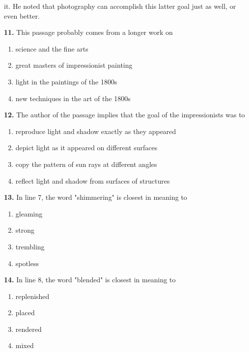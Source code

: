 \documentclass[12pt]{article}
\begin{document}
it. He noted that photography can accomplish this latter goal just as well, or even better.\par
\endgroup
\medskip
\noindent\textbf{11.} This passage probably comes from a longer work on
\begin{enumerate}[label=(\Alph*),leftmargin=*,itemsep=0.2em]
\item science and the fine arts
\item great masters of impressionist painting
\item light in the paintings of the 1800s
\item new techniques in the art of the 1800s
\end{enumerate}
\par
\vspace{0.25\baselineskip}
\noindent\textbf{12.} The author of the passage implies that the goal of the impressionists was to
\begin{enumerate}[label=(\Alph*),leftmargin=*,itemsep=0.2em]
\item reproduce light and shadow exactly as they appeared
\item depict light as it appeared on different surfaces
\item copy the pattern of sun rays at different angles
\item reflect light and shadow from surfaces of structures
\end{enumerate}
\par
\vspace{0.25\baselineskip}
\noindent\textbf{13.} In line 7, the word "shimmering" is closest in meaning to
\begin{enumerate}[label=(\Alph*),leftmargin=*,itemsep=0.2em]
\item gleaming
\item strong
\item trembling
\item spotless
\end{enumerate}
\par
\vspace{0.25\baselineskip}
\noindent\textbf{14.} In line 8, the word "blended" is closest in meaning to
\begin{enumerate}[label=(\Alph*),leftmargin=*,itemsep=0.2em]
\item replenished
\item placed
\item rendered
\item mixed
\end{enumerate}
\par
\end{document}
